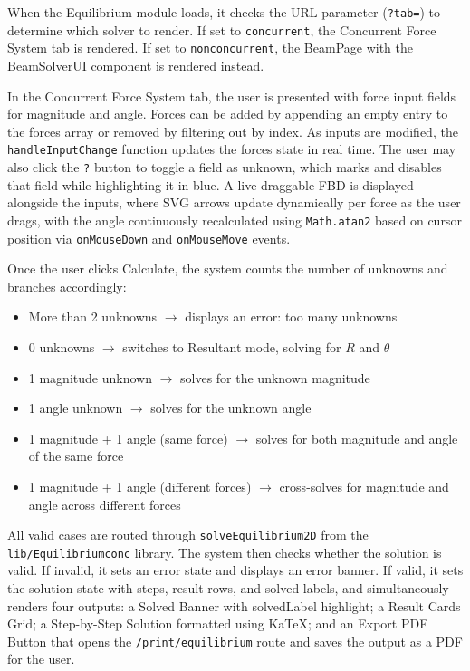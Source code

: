 When the Equilibrium module loads, it checks the URL parameter 
(\texttt{?tab=}) to determine which solver to render. If set to 
\texttt{concurrent}, the Concurrent Force System tab is rendered. If 
set to \texttt{nonconcurrent}, the BeamPage with the BeamSolverUI 
component is rendered instead.

In the Concurrent Force System tab, the user is presented with force 
input fields for magnitude and angle. Forces can be added by 
appending an empty entry to the forces array or removed by filtering 
out by index. As inputs are modified, the \texttt{handleInputChange} 
function updates the forces state in real time. The user may also 
click the \texttt{?} button to toggle a field as unknown, which marks 
and disables that field while highlighting it in blue. A live 
draggable FBD is displayed alongside the inputs, where SVG arrows 
update dynamically per force as the user drags, with the angle 
continuously recalculated using \texttt{Math.atan2} based on cursor 
position via \texttt{onMouseDown} and \texttt{onMouseMove} events.

Once the user clicks Calculate, the system counts the number of 
unknowns and branches accordingly:

\begin{itemize}
    \item More than 2 unknowns $\rightarrow$ displays an error: too 
    many unknowns
    \item 0 unknowns $\rightarrow$ switches to Resultant mode, solving 
    for $R$ and $\theta$
    \item 1 magnitude unknown $\rightarrow$ solves for the unknown 
    magnitude
    \item 1 angle unknown $\rightarrow$ solves for the unknown angle
    \item 1 magnitude + 1 angle (same force) $\rightarrow$ solves for 
    both magnitude and angle of the same force
    \item 1 magnitude + 1 angle (different forces) $\rightarrow$ 
    cross-solves for magnitude and angle across different forces
\end{itemize}

All valid cases are routed through \texttt{solveEquilibrium2D} from 
the \texttt{lib/Equilibriumconc} library. The system then checks 
whether the solution is valid. If invalid, it sets an error state and 
displays an error banner. If valid, it sets the solution state with 
steps, result rows, and solved labels, and simultaneously renders four 
outputs: a Solved Banner with solvedLabel highlight; a Result Cards 
Grid; a Step-by-Step Solution formatted using KaTeX; and an Export 
PDF Button that opens the \texttt{/print/equilibrium} route and saves 
the output as a PDF for the user.

